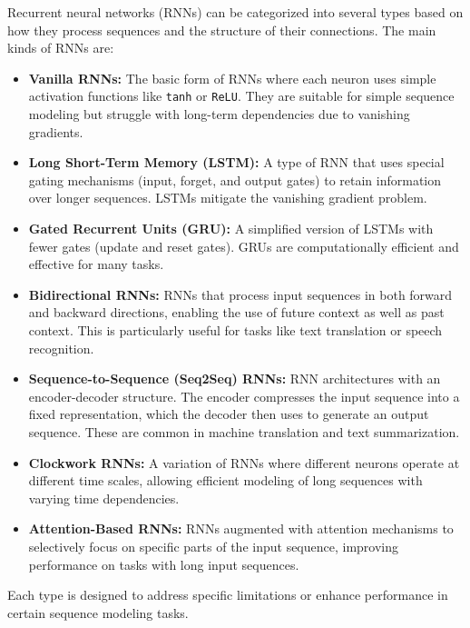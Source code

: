 Recurrent neural networks (RNNs) can be categorized into several types based on how they process sequences and the structure of their connections. The main kinds of RNNs are:

\begin{itemize}
    \item \textbf{Vanilla RNNs:} The basic form of RNNs where each neuron uses simple activation functions like \texttt{tanh} or \texttt{ReLU}. They are suitable for simple sequence modeling but struggle with long-term dependencies due to vanishing gradients.

    \item \textbf{Long Short-Term Memory (LSTM):} A type of RNN that uses special gating mechanisms (input, forget, and output gates) to retain information over longer sequences. LSTMs mitigate the vanishing gradient problem.

    \item \textbf{Gated Recurrent Units (GRU):} A simplified version of LSTMs with fewer gates (update and reset gates). GRUs are computationally efficient and effective for many tasks.

    \item \textbf{Bidirectional RNNs:} RNNs that process input sequences in both forward and backward directions, enabling the use of future context as well as past context. This is particularly useful for tasks like text translation or speech recognition.

    \item \textbf{Sequence-to-Sequence (Seq2Seq) RNNs:} RNN architectures with an encoder-decoder structure. The encoder compresses the input sequence into a fixed representation, which the decoder then uses to generate an output sequence. These are common in machine translation and text summarization.

    \item \textbf{Clockwork RNNs:} A variation of RNNs where different neurons operate at different time scales, allowing efficient modeling of long sequences with varying time dependencies.

    \item \textbf{Attention-Based RNNs:} RNNs augmented with attention mechanisms to selectively focus on specific parts of the input sequence, improving performance on tasks with long input sequences.

\end{itemize}

Each type is designed to address specific limitations or enhance performance in certain sequence modeling tasks.


